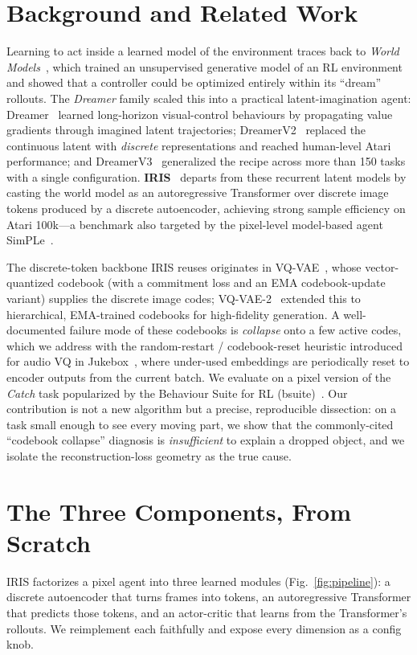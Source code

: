 \documentclass[11pt]{article}
\begin{document}
\section{Background and Related Work}
\label{sec:related}
Learning to act inside a learned model of the environment traces back to
\emph{World Models}~\cite{worldmodels}, which trained an unsupervised generative
model of an RL environment and showed that a controller could be optimized
entirely within its ``dream'' rollouts. The \emph{Dreamer} family scaled this
into a practical latent-imagination agent: Dreamer~\cite{dreamer} learned
long-horizon visual-control behaviours by propagating value gradients through
imagined latent trajectories; DreamerV2~\cite{dreamerv2} replaced the continuous
latent with \emph{discrete} representations and reached human-level Atari
performance; and DreamerV3~\cite{dreamerv3} generalized the recipe across more
than 150 tasks with a single configuration. \textbf{IRIS}~\cite{iris} departs
from these recurrent latent models by casting the world model as an
autoregressive Transformer over discrete image tokens produced by a discrete
autoencoder, achieving strong sample efficiency on Atari 100k---a benchmark also
targeted by the pixel-level model-based agent SimPLe~\cite{simple}.

The discrete-token backbone IRIS reuses originates in VQ-VAE~\cite{vqvae}, whose
vector-quantized codebook (with a commitment loss and an EMA codebook-update
variant) supplies the discrete image codes; VQ-VAE-2~\cite{vqvae2} extended this
to hierarchical, EMA-trained codebooks for high-fidelity generation. A
well-documented failure mode of these codebooks is \emph{collapse} onto a few
active codes, which we address with the random-restart / codebook-reset
heuristic introduced for audio VQ in Jukebox~\cite{jukebox}, where under-used
embeddings are periodically reset to encoder outputs from the current batch. We
evaluate on a pixel version of the \emph{Catch} task popularized by the
Behaviour Suite for RL (bsuite)~\cite{bsuite}. Our contribution is not a new
algorithm but a precise, reproducible dissection: on a task small enough to see
every moving part, we show that the commonly-cited ``codebook collapse''
diagnosis is \emph{insufficient} to explain a dropped object, and we isolate the
reconstruction-loss geometry as the true cause.

\section{The Three Components, From Scratch}
\label{sec:components}
IRIS factorizes a pixel agent into three learned modules
(Fig.~\ref{fig:pipeline}): a discrete autoencoder that turns frames into tokens,
an autoregressive Transformer that predicts those tokens, and an actor-critic
that learns from the Transformer's rollouts. We reimplement each faithfully and
expose every dimension as a config knob.
\end{document}

